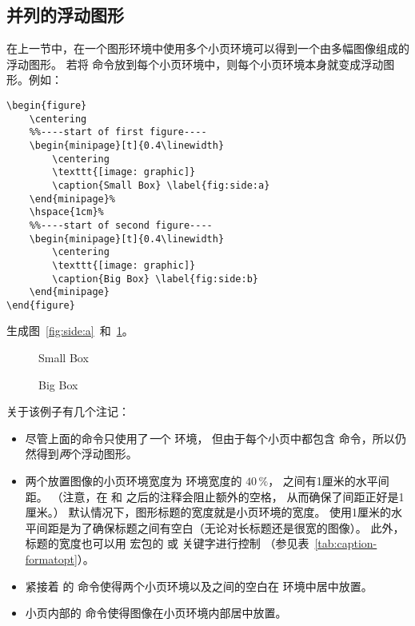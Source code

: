 \subsection{并列的浮动图形}\label{ssec:sidefigure}

在上一节中，在一个图形环境中使用多个小页环境可以得到一个由多幅图像组成的浮动图形。
若将   命令放到每个小页环境中，则每个小页环境本身就变成浮动图形。例如：
\begin{lstlisting}
\begin{figure}
	\centering
	%%----start of first figure----
	\begin{minipage}[t]{0.4\linewidth}
		\centering
		\texttt{[image: graphic]}
		\caption{Small Box} \label{fig:side:a}
	\end{minipage}%
	\hspace{1cm}%
	%%----start of second figure----
	\begin{minipage}[t]{0.4\linewidth}
		\centering
		\texttt{[image: graphic]}
		\caption{Big Box} \label{fig:side:b}
	\end{minipage}
\end{figure}
\end{lstlisting}
生成图~\ref{fig:side:a}~和~\ref{fig:side:b}。

\begin{figure}
	\centering
	\begin{minipage}[t]{0.4\linewidth}
		\centering
		\resizebox{1in}{!}{\usebox{\boxgraphic}}
		\caption{Small Box} \label{fig:side:a}
	\end{minipage}%
	\hspace{1cm}%
	\begin{minipage}[t]{0.4\linewidth}
		\centering
		\resizebox{1.5in}{!}{\usebox{\boxgraphic}}
		\caption{Big Box} \label{fig:side:b}
	\end{minipage}
\end{figure}

关于该例子有几个注记：
\begin{itemize}
	\item 尽管上面的命令只使用了\emph{一}个  环境，
	但由于每个小页中都包含  命令，所以仍然得到\emph{两}个浮动图形。
	
	\item 两个放置图像的小页环境宽度为  环境宽度的 $40\,\percent$，
	之间有1厘米的水平间距。
	（注意，在  和  之后的注释会阻止额外的空格，
	从而确保了间距正好是1厘米。）
	默认情况下，图形标题的宽度就是小页环境的宽度。
	使用1厘米的水平间距是为了确保标题之间有空白（无论对长标题还是很宽的图像）。
	此外，标题的宽度也可以用  宏包的  或  关键字进行控制
	（参见表~\ref{tab:caption-formatopt}）。
	
	\item 紧接着  的  命令使得两个小页环境以及之间的空白在  环境中居中放置。
		
	\item 小页内部的  命令使得图像在小页环境内部居中放置。
\end{itemize}

